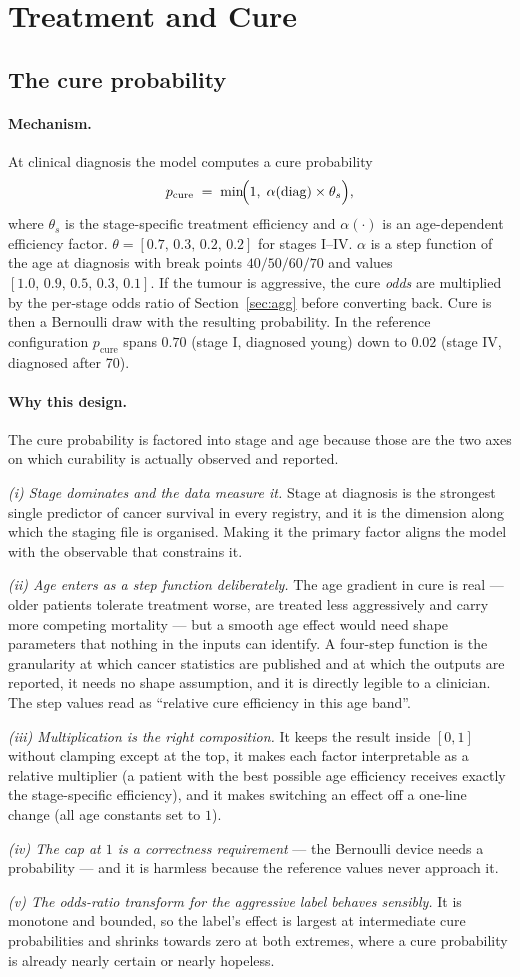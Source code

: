 \documentclass[12pt,a4paper]{article}
\newcommand{\mech}[1]{\paragraph{Mechanism.} #1}
\newcommand{\why}[1]{\paragraph{Why this design.} #1}
\begin{document}
\section{Treatment and Cure}

\subsection{The cure probability}

\mech{At clinical diagnosis the model computes a cure probability
\[
p_{\text{cure}} \;=\; \min\!\Bigl(1,\; \alpha(\text{diag})\times \theta_{s}\Bigr),
\]
where $\theta_s$ is the stage-specific treatment efficiency and $\alpha(\cdot)$ is an age-dependent
efficiency factor. $\theta = [0.7,\,0.3,\,0.2,\,0.2]$ for stages I--IV. $\alpha$ is a step function of the
age at diagnosis with break points $40/50/60/70$ and values $[1.0,\,0.9,\,0.5,\,0.3,\,0.1]$. If the tumour
is aggressive, the cure \emph{odds} are multiplied by the per-stage odds ratio of
Section~\ref{sec:agg} before converting back. Cure is then a Bernoulli draw with the resulting
probability. In the reference configuration $p_{\text{cure}}$ spans $0.70$ (stage I, diagnosed young) down
to $0.02$ (stage IV, diagnosed after 70).}

\why{The cure probability is factored into stage and age because those are the two axes on which
curability is actually observed and reported.

\emph{(i) Stage dominates and the data measure it.} Stage at diagnosis is the strongest single predictor of
cancer survival in every registry, and it is the dimension along which the staging file is organised.
Making it the primary factor aligns the model with the observable that constrains it.

\emph{(ii) Age enters as a step function deliberately.} The age gradient in cure is real --- older patients
tolerate treatment worse, are treated less aggressively and carry more competing mortality --- but a smooth
age effect would need shape parameters that nothing in the inputs can identify. A four-step function is
the granularity at which cancer statistics are published and at which the outputs are reported, it needs
no shape assumption, and it is directly legible to a clinician. The step values read as ``relative cure
efficiency in this age band''.

\emph{(iii) Multiplication is the right composition.} It keeps the result inside $[0,1]$ without clamping
except at the top, it makes each factor interpretable as a relative multiplier (a patient with the best
possible age efficiency receives exactly the stage-specific efficiency), and it makes switching an effect
off a one-line change (all age constants set to $1$).

\emph{(iv) The cap at $1$ is a correctness requirement} --- the Bernoulli device needs a probability --- and
it is harmless because the reference values never approach it.

\emph{(v) The odds-ratio transform for the aggressive label behaves sensibly.} It is monotone and bounded,
so the label's effect is largest at intermediate cure probabilities and shrinks towards zero at both
extremes, where a cure probability is already nearly certain or nearly hopeless.}
\end{document}
